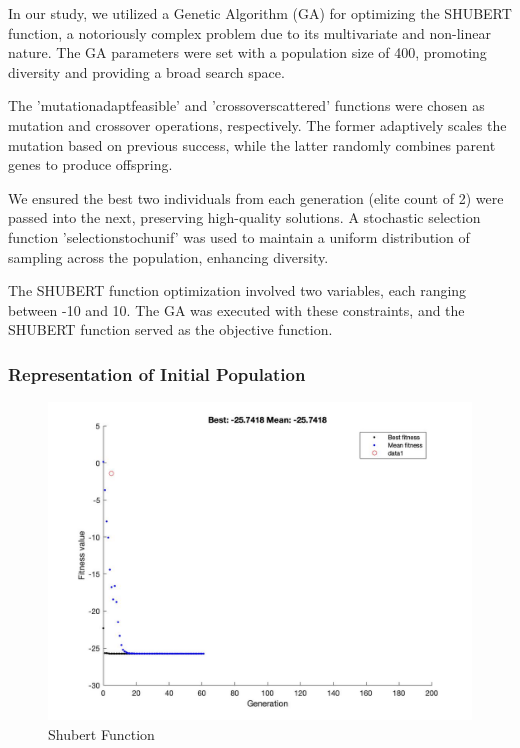 \documentclass[conference]{inc/IEEEtran}
\begin{document}
In our study, we utilized a Genetic Algorithm (GA) for optimizing the SHUBERT function, a notoriously complex problem due to its multivariate and non-linear nature. The GA parameters were set with a population size of 400, promoting diversity and providing a broad search space.

The 'mutationadaptfeasible' and 'crossoverscattered' functions were chosen as mutation and crossover operations, respectively. The former adaptively scales the mutation based on previous success, while the latter randomly combines parent genes to produce offspring. 

We ensured the best two individuals from each generation (elite count of 2) were passed into the next, preserving high-quality solutions. A stochastic selection function 'selectionstochunif' was used to maintain a uniform distribution of sampling across the population, enhancing diversity.

The SHUBERT function optimization involved two variables, each ranging between -10 and 10. The GA was executed with these constraints, and the SHUBERT function served as the objective function. 


\subsubsection{Representation of Initial Population}

\begin{figure}
    \includegraphics[width=\linewidth]{figures/shubert.jpg}
    \caption{Shubert Function}
    \label{fig:boat1}
  \end{figure}
\end{document}
